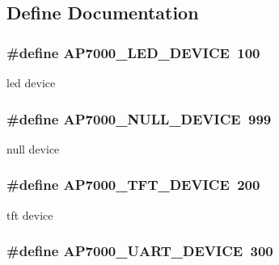 \subsection{Define Documentation}
\hypertarget{group___a_p7000___d_e_v_g065b4e419d65dbf6c53e09055056f3ba}{
\subsubsection[{AP7000\_\-LED\_\-DEVICE}]{\setlength{\rightskip}{0pt plus 5cm}\#define AP7000\_\-LED\_\-DEVICE~100}}
\label{group___a_p7000___d_e_v_g065b4e419d65dbf6c53e09055056f3ba}


led device \hypertarget{group___a_p7000___d_e_v_gf7417306a0bc7584c3b90c7e842dfa7d}{
\subsubsection[{AP7000\_\-NULL\_\-DEVICE}]{\setlength{\rightskip}{0pt plus 5cm}\#define AP7000\_\-NULL\_\-DEVICE~999}}
\label{group___a_p7000___d_e_v_gf7417306a0bc7584c3b90c7e842dfa7d}


null device \hypertarget{group___a_p7000___d_e_v_gcee8aa4103d694c10d1b908a6983c051}{
\subsubsection[{AP7000\_\-TFT\_\-DEVICE}]{\setlength{\rightskip}{0pt plus 5cm}\#define AP7000\_\-TFT\_\-DEVICE~200}}
\label{group___a_p7000___d_e_v_gcee8aa4103d694c10d1b908a6983c051}


tft device \hypertarget{group___a_p7000___d_e_v_g5a7c086eb68e737d93168b6dbcde7d0d}{
\subsubsection[{AP7000\_\-UART\_\-DEVICE}]{\setlength{\rightskip}{0pt plus 5cm}\#define AP7000\_\-UART\_\-DEVICE~300}}
\label{group___a_p7000___d_e_v_g5a7c086eb68e737d93168b6dbcde7d0d}



